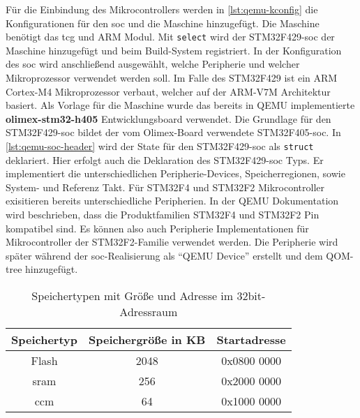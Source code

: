 Für die Einbindung des Mikrocontrollers werden in \ref{lst:qemu-kconfig} die
Konfigurationen für den \ac{soc} und die Maschine hinzugefügt.
Die Maschine benötigt das \ac{tcg} und ARM Modul.
Mit \texttt{select} wird der STM32F429-\ac{soc} der Maschine hinzugefügt und
beim Build-System registriert.
In der Konfiguration des \ac{soc} wird anschließend ausgewählt, welche
Peripherie und welcher Mikroprozessor verwendet werden soll.
Im Falle des STM32F429 ist ein ARM Cortex-M4 Mikroprozessor verbaut, welcher
auf der ARM-V7M Architektur basiert.
Als Vorlage für die Maschine wurde das bereits in QEMU implementierte
\textbf{olimex-stm32-h405} Entwicklungsboard verwendet\cite{QemuOlimexBoard}.
Die Grundlage für den STM32F429-\ac{soc} bildet der vom Olimex-Board verwendete
STM32F405-\ac{soc}\cite{QemuStmF405Soc}.
\newline
In \ref{lst:qemu-soc-header} wird der State für den STM32F429-\ac{soc} als
\texttt{struct} deklariert.
Hier erfolgt auch die Deklaration des STM32F429-\ac{soc} Typs.
Er implementiert die unterschiedlichen Peripherie-Devices, Speicherregionen,
sowie System- und Referenz Takt.
Für STM32F4 und STM32F2 Mikrocontroller exisitieren bereits unterschiedliche
Peripherien.
In der QEMU Dokumentation wird beschrieben, dass die Produktfamilien STM32F4
und STM32F2 Pin kompatibel sind.
Es können also auch Peripherie Implementationen für Mikrocontroller der
STM32F2-Familie verwendet werden.
Die Peripherie wird später während der \ac{soc}-Realisierung als \enquote{QEMU
Device} erstellt und dem QOM-tree hinzugefügt.
\newline
\begin{table}[h!]
    \begin{center}
    \caption{Speichertypen mit Größe und Adresse im 32bit-Adressraum}
    \label{tab:stm32-memory}
    \begin{tabular}{||c|c|c||}
        \hline
        \textbf{Speichertyp} & \textbf{Speichergröße in KB} & \textbf{Startadresse} \\
        \hline
        \hline
        \hspace{0.1cm}
        Flash & 2048 & 0x0800 0000 \\
        \hline
        \hspace{0.1cm}
        \ac{sram} & 256 & 0x2000 0000 \\
        \hline
        \hspace{0.1cm}
        \ac{ccm} & 64 & 0x1000 0000 \\
        \hline
    \end{tabular}
    \end{center}
\end{table}


